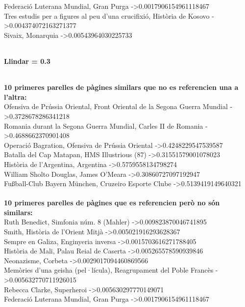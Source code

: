 \documentclass{report}
\begin{document}
Federació Luterana Mundial, Gran Purga -\textgreater 0.0017906154961118467 \\
Tres estudis per a figures al peu d'una crucifixió, Història de Kosovo -\textgreater 0.004374072163271377 \\
Sivaix, Monarquia -\textgreater 0.00543964030225733 \\
 \\
\newline
\centerline{ \textbf{Llindar = 0.3} }
\newline
 \\
\textbf{10 primeres parelles de pàgines similars que no es referencien una a l'altra:} \\
Ofensiva de Prússia Oriental, Front Oriental de la Segona Guerra Mundial -\textgreater 0.3728678286341218 \\
Romania durant la Segona Guerra Mundial, Carles II de Romania -\textgreater 0.4688662370901408 \\
Operació Bagration, Ofensiva de Prússia Oriental -\textgreater 0.4248229547539587 \\
Batalla del Cap Matapan, HMS Illustrious (87) -\textgreater 0.31551579001078023 \\
Història de l'Argentina, Argentina -\textgreater 0.5759558134798274 \\
William Sholto Douglas, James O'Meara -\textgreater 0.30860727097192947 \\
Fußball-Club Bayern München, Cruzeiro Esporte Clube -\textgreater 0.5139419149640321 \\
 \\
\textbf{10 primeres parelles de pàgines que es referencien però no són similars:} \\
Ruth Benedict, Simfonia núm. 8 (Mahler) -\textgreater 0.009823870046741895 \\
Smith, Història de l'Orient Mitjà -\textgreater 0.005021916293628367 \\
Sempre en Galiza, Enginyeria inversa -\textgreater 0.0015703616271788405 \\
Història de Mali, Palau Reial de Caserta -\textgreater 0.005265578590939846 \\
Neonazisme, Corbeta -\textgreater 0.0029017094460869566 \\
Memòries d'una geisha (pel·lícula), Reagrupament del Poble Francès -\textgreater 0.005632770711926015 \\
Rebecca Clarke, Superheroi -\textgreater 0.005630297770149071 \\
Federació Luterana Mundial, Gran Purga -\textgreater 0.0017906154961118467 \\
\end{document}
